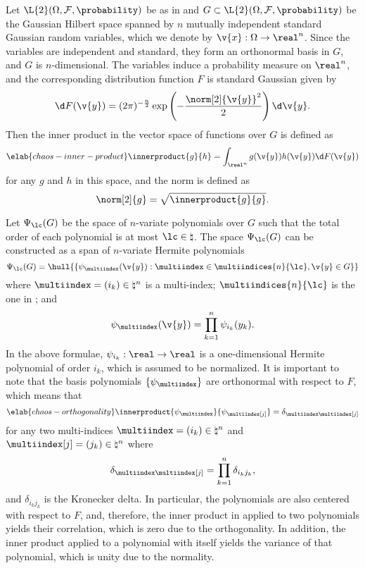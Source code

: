 Let $\L{2}(\Omega, \mathcal{F}, \probability)$ be as in
 and $G \subset \L{2}(\Omega, \mathcal{F},
\probability)$ be the Gaussian Hilbert space \cite{janson1997} spanned by $n$
mutually independent standard Gaussian random variables, which we denote by
$\v{x}: \Omega \to \real^n$. Since the variables are independent and standard,
they form an orthonormal basis in $G$, and $G$ is $n$-dimensional. The variables
induce a probability measure on $\real^n$, and the corresponding distribution
function $F$ is standard Gaussian given by
\[
  \d F(\v{y}) = (2 \pi)^{-\frac{n}{2}} \exp\left(-\frac{\norm[2]{\v{y}}^2}{2}\right) \d \v{y}.
\]
Then the inner product in the vector space of functions over $G$ is defined as
\begin{equation} \elab{chaos-inner-product}
  \innerproduct{g}{h} = \int_{\real^n} g(\v{y}) h(\v{y}) \d F(\v{y})
\end{equation}
for any $g$ and $h$ in this space, and the norm is defined as
\[
  \norm[2]{g} = \sqrt{\innerproduct{g}{g}}.
\]

Let $\Psi_\lc(G)$ be the space of $n$-variate polynomials over $G$ such that the
total order of each polynomial is at most $\lc \in \natural$. The space
$\Psi_\lc(G)$ can be constructed as a span of $n$-variate Hermite polynomials
\cite{eldred2008, maitre2010}
\[
  \Psi_\lc(G) = \hull{\left\{ \psi_{\multiindex}(\v{y}): \multiindex \in \multiindices{n}{\lc}, \v{y} \in G \right\}}
\]
where $\multiindex = (i_k) \in \natural^n$ is a multi-index;
$\multiindices{n}{\lc}$ is the one in ; and
\[
  \psi_{\multiindex}(\v{y}) = \prod_{k = 1}^n \psi_{i_k}(y_k).
\]
In the above formulae, $\psi_{i_k}: \real \to \real$ is a one-dimensional
Hermite polynomial of order $i_k$, which is assumed to be normalized. It is
important to note that the basis polynomials $\{ \psi_{\multiindex} \}$ are
orthonormal with respect to $F$, which means that
\begin{equation} \elab{chaos-orthogonality}
  \innerproduct{\psi_{\multiindex}}{\psi_{\multiindex[j]}} = \delta_{\multiindex \multiindex[j]}
\end{equation}
for any two multi-indices $\multiindex = (i_k) \in \natural^n$ and
$\multiindex[j] = (j_k) \in \natural^n$ where
\[
  \delta_{\multiindex \multiindex[j]} = \prod_{k = 1}^n \delta_{i_k j_k},
\]
and $\delta_{i_k j_k}$ is the Kronecker delta. In particular, the polynomials
are also centered with respect to $F$, and, therefore, the inner product in
 applied to two polynomials yields their correlation,
which is zero due to the orthogonality. In addition, the inner product applied
to a polynomial with itself yields the variance of that polynomial, which is
unity due to the normality.

